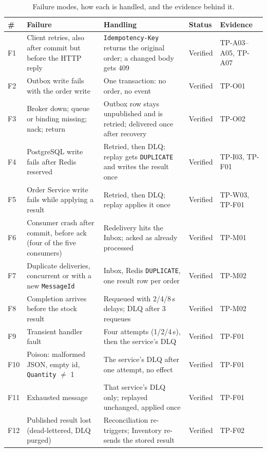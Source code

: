 \documentclass[a4paper]{report}
\begin{document}
\begin{table}[tbp]
\centering
\scriptsize
\caption{Failure modes, how each is handled, and the evidence behind it.}
\label{tab:failure-modes}
\begin{tabular}{@{}>{\raggedright\arraybackslash}p{0.6cm}>{\raggedright\arraybackslash}p{3.7cm}>{\raggedright\arraybackslash}p{4.6cm}>{\raggedright\arraybackslash}p{1.55cm}>{\raggedright\arraybackslash}p{1.6cm}@{}}
\toprule
\# & Failure & Handling & Status & Evidence \\
\midrule
F1 & Client retries, also after commit but before the HTTP reply & \texttt{Idempotency-Key} returns the original order; a changed body gets 409 & Verified & TP-A03--A05, TP-A07 \\
F2 & Outbox write fails with the order write & One transaction: no order, no event & Verified & TP-O01 \\
F3 & Broker down; queue or binding missing; nack; return & Outbox row stays unpublished and is retried; delivered once after recovery & Verified & TP-O02 \\
F4 & PostgreSQL write fails after Redis reserved & Retried, then DLQ; replay gets \texttt{DUPLICATE} and writes the result once & Verified & TP-I03, TP-F01 \\
F5 & Order Service write fails while applying a result & Retried, then DLQ; replay applies it once & Verified & TP-W03, TP-F01 \\
F6 & Consumer crash after commit, before ack (four of the five consumers) & Redelivery hits the Inbox; acked as already processed & Verified & TP-M01 \\
F7 & Duplicate deliveries, concurrent or with a new \texttt{MessageId} & Inbox, Redis \texttt{DUPLICATE}, one result row per order & Verified & TP-M02 \\
F8 & Completion arrives before the stock result & Requeued with 2/4/8\,s delays; DLQ after 3 requeues & Verified & TP-M02 \\
F9 & Transient handler fault & Four attempts (1/2/4\,s), then the service's DLQ & Verified & TP-F01 \\
F10 & Poison: malformed JSON, empty id, \texttt{Quantity} $\neq$ 1 & The service's DLQ after one attempt, no effect & Verified & TP-F01 \\
F11 & Exhausted message & That service's DLQ only; replayed unchanged, applied once & Verified & TP-F01 \\
F12 & Published result lost (dead-lettered, DLQ purged) & Reconciliation re-triggers; Inventory re-sends the stored result & Verified & TP-F02 \\

\end{tabular}
\end{table}
\end{document}
